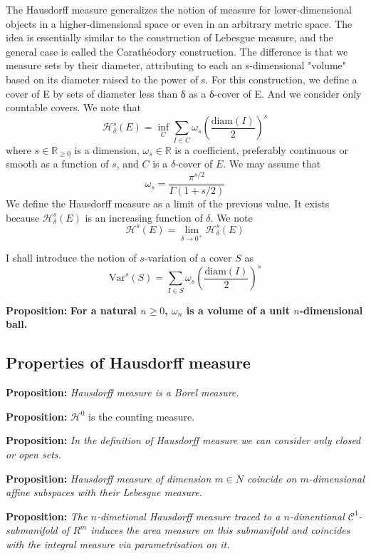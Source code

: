 The Hausdorff measure generalizes the notion of measure for lower-dimensional
objects in a higher-dimensional space or even in an arbitrary metric space.
The idea is essentially similar to the construction of Lebesgue measure, and
the general case is called the Carathéodory construction. The difference is
that we measure sets by their diameter, attributing to each an s-dimensional
"volume" based on its diameter raised to the power of s. For this construction,
we define a cover of E by sets of diameter less than δ as a δ-cover of E. And
we consider only countable covers. We note that
\[\mathcal{H}_\delta^s(E)=\inf_{C}\sum_{I\in C}\omega_s\left(\frac{\text{diam}(I)}{2}\right)^s\]
where $s\in\mathbb{R}_{\geq 0}$ is a dimension, $\omega_s\in\mathbb{R}$ is a
coefficient, preferably continuous or smooth as a function of $s$, and $C$ is a
$\delta$-cover of $E$. We may assume that
\[\omega_s = \frac{\pi^{s/2}}{\Gamma(1+s/2)}\]
We define the Hausdorff measure as a limit of the previous value. It exists
because $\mathcal{H}_\delta^s(E)$ is an increasing function of $\delta$. We note
\[\mathcal{H}^s(E)=\lim_{\delta\rightarrow0^+}\mathcal{H}^s_\delta(E)\]

I shall introduce the notion of $s$-variation of a cover $S$ as
\[\text{Var}^s(S)=\sum_{I\in S}\omega_s\left(\frac{\text{diam}(I)}{2}\right)^s\]

\textbf{Proposition:} \textbf{For a natural $n\geq 0$, $\omega_n$ is a volume of a unit
$n$-dimensional ball.}
\vspace{1ex}

\subsection{Properties of Hausdorff measure}

\textbf{Proposition:} \textit{Hausdorff measure is a Borel measure.}

\vspace{2ex}
\textbf{Proposition:} $\mathcal H^0$ is the counting measure.

\vspace{2ex}
\textbf{Proposition:} \textit{In the definition of Hausdorff measure we can consider
only closed or open sets.}

\vspace{2ex}
\textbf{Proposition:} \textit{Hausdorff measure of dimension $m\in N$ coincide on
$m$-dimensional affine subspaces with their Lebesgue measure.}

\vspace{2ex}
\textbf{Proposition:} \textit{The $n$-dimetional Hausdorff measure traced to a
$n$-dimentional $\mathcal{C}^1$-submanifold of $R^m$ induces the area measure
on this submanifold and coincides with the integral measure via parametrisation
on it.}

